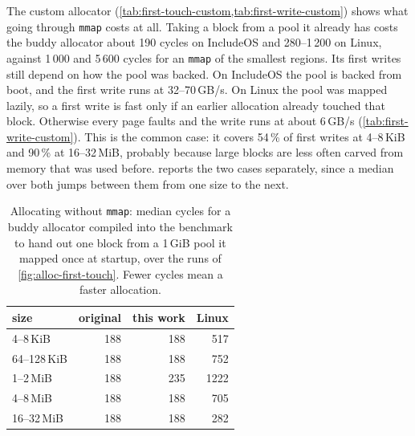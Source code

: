 \documentclass[12pt]{report}
\newcommand{\systhis}[1]{\textcolor{systhis}{\textbf{#1}}}
\newcommand{\sysorig}[1]{\textcolor{sysorig}{\textbf{#1}}}
\newcommand{\syslinux}[1]{\textcolor{syslinux}{\textbf{#1}}}
\newcommand{\colortablesetup}{%
  \setlength{\aboverulesep}{0pt}\setlength{\belowrulesep}{0pt}%
  \setlength{\extrarowheight}{2pt}}
\renewcommand{\_}{\origunderscore\allowbreak}
\begin{document}
The custom allocator (\cref{tab:first-touch-custom,tab:first-write-custom}) shows what going through \texttt{mmap} costs at all. Taking a block from a pool it already has costs the buddy allocator about 190 cycles on IncludeOS and 280--1\,200 on Linux, against 1\,000 and 5\,600 cycles for an \texttt{mmap} of the smallest regions. Its first writes still depend on how the pool was backed. On IncludeOS the pool is backed from boot, and the first write runs at 32--70\,GB/s. On Linux the pool was mapped lazily, so a first write is fast only if an earlier allocation already touched that block. Otherwise every page faults and the write runs at about 6\,GB/s (\cref{tab:first-write-custom}). This is the common case: it covers 54\,\% of first writes at 4--8\,KiB and 90\,\% at 16--32\,MiB, probably because large blocks are less often carved from memory that was used before.  reports the two cases separately, since a median over both jumps between them from one size to the next.

\begin{table}[h]
  \centering
  \small
  \caption{Allocating without \texttt{mmap}: median cycles for a buddy allocator compiled into the benchmark to hand out one block from a 1\,GiB pool it mapped once at startup, over the runs of \cref{fig:alloc-first-touch}. Fewer cycles mean a faster allocation.}
  \label{tab:first-touch-custom}
  \colortablesetup
  \setlength{\tabcolsep}{9pt}
  \begin{tabular}{lrrr}
    \toprule
    size & \sysorig{original} & \systhis{this work} & \syslinux{Linux} \\
    \midrule
    4--8\,KiB    & 188 & 188 & 517  \\
    64--128\,KiB & 188 & 188 & 752  \\
    1--2\,MiB    & 188 & 235 & 1222 \\
    4--8\,MiB    & 188 & 188 & 705  \\
    16--32\,MiB  & 188 & 188 & 282  \\
    \bottomrule
  \end{tabular}
\end{table}
\end{document}
